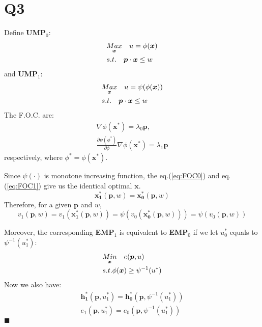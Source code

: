 \documentclass{article}
\begin{document}
\section{Q3}
Define {\bf UMP$_0$}:
\begin{align} \notag
	&\underset{\bm{x}}{Max}\quad u = \phi(\bm{x}) \\ \notag
	&s.t. \quad \bm{p} \cdot \bm{x} \leq w
\end{align}
and {\bf UMP$_1$}:
\begin{align} \notag
	&\underset{\bm{x}}{Max}\quad u = \psi(\phi(\bm{x})) \\ \notag
	&s.t. \quad \bm{p} \cdot \bm{x} \leq w
\end{align}
The {F.O.C.} are:
\begin{align}
	\nabla \phi(\bm{x^*}) = \lambda_{0}\bm{p}, \label{eq:FOC0}\\
	\frac{\partial \psi(\phi^*)}{\partial \phi}\nabla \phi(\bm{x^*}) = \lambda_{1}\bm{p}\label{eq:FOC1}
\end{align}
respectively, where $\phi^*=\phi(\bm{x^*})$. 

Since $\psi(\cdot)$ is monotone increasing function, the eq.(\ref{eq:FOC0}) and eq.(\ref{eq:FOC1}) give us the identical optimal $\bm{x}$.
\begin{equation}
	\bm{x^{*}_1}(\bm{p},w) = \bm{x^{*}_0}(\bm{p},w)
\end{equation} 
 Therefore, for a given $\bm{p}$ and $w$, 
\begin{equation}
	v_{1}(\bm{p},w) = v_{1}(\bm{x^{*}_1}(\bm{p},w)) = \psi(v_{0}(\bm{x^{*}_0}(\bm{p},w))) = \psi(v_{0}(\bm{p},w))
\end{equation}

Moreover, the corresponding {\bf EMP$_1$} is equivalent to {\bf EMP$_0$} if we let $u^{*}_0$ equals to $\psi^{-1}(u^{*}_1)$:
\begin{align}\notag
	&\underset{\bm{x}}{Min}\quad e(\bm{p},u) \\ \notag
	&s.t. \phi(\bm{x}) \geq \psi^{-1}(u^*)
\end{align}
Now we also have:
\begin{align}
	\bm{h^{*}_1}(\bm{p},u^{*}_1) = \bm{h^{*}_0}(\bm{p},\psi^{-1}(u^{*}_1))\\
	e_{1}(\bm{p},u^{*}_1) = e_{0}(\bm{p},\psi^{-1}(u^{*}_1))
\end{align}
$\blacksquare$
\end{document}
